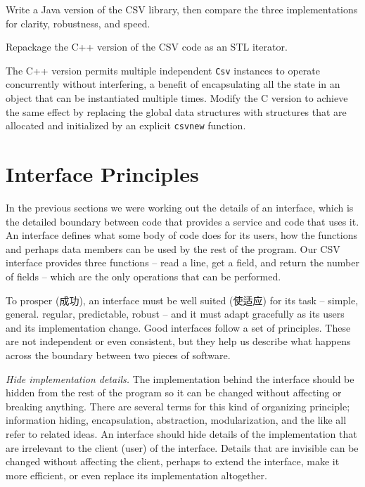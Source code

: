 \begin{exercise}
    Write a Java version of the CSV library, then compare the three
    implementations for clarity, robustness, and speed.
\end{exercise}

\begin{exercise}
    Repackage the C++ version of the CSV code as an STL iterator.
\end{exercise}

\begin{exercise}
    \label{exer:csvnew}
    The C++ version permits multiple independent \verb'Csv' instances to
    operate concurrently without interfering, a benefit of encapsulating
    all the state in an object that can be instantiated multiple times.
    Modify the C version to achieve the same effect by replacing the global
    data structures with structures that are allocated and initialized by
    an explicit \verb'csvnew' function.
\end{exercise}

\section{Interface Principles}
\label{sec:interface_principles}

In the previous sections we were working out the details of an interface,
which is the detailed boundary between code that provides a service and
code that uses it. An interface defines what some body of code does for its
users, how the functions and perhaps data members can be used by the rest
of the program. Our CSV interface provides three functions -- read a line,
get a field, and return the number of fields -- which are the only
operations that can be performed.

To prosper (成功), an interface must be well suited (使适应) for its task
-- simple, general.  regular, predictable, robust -- and it must adapt
gracefully as its users and its implementation change. Good interfaces
follow a set of principles. These are not independent or even consistent,
but they help us describe what happens across the boundary between two
pieces of software.

\emph{Hide implementation details.} The implementation behind the interface
should be hidden from the rest of the program so it can be changed without
affecting or breaking anything. There are several terms for this kind of
organizing principle; information hiding, encapsulation, abstraction,
modularization, and the like all refer to related ideas. An interface
should hide details of the implementation that are irrelevant to the client
(user) of the interface. Details that are invisible can be changed without
affecting the client, perhaps to extend the interface, make it more
efficient, or even replace its implementation altogether.

